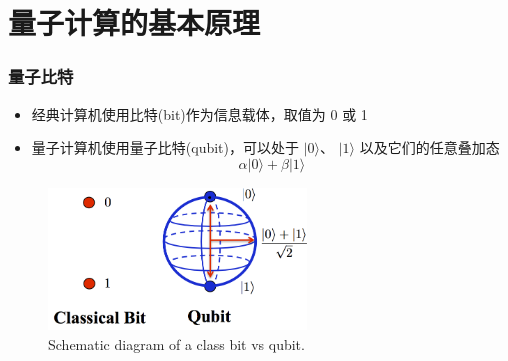 \section{量子计算的基本原理}
\begin{frame}
    \frametitle{量子比特}
    \begin{itemize}
	    \item 经典计算机使用比特\textrm{(bit)}作为信息载体，取值为 0 或 1
	    \item 量子计算机使用量子比特\textrm{(qubit)}，可以处于 \( |0\rangle \)、 \( |1\rangle \) 以及它们的任意叠加态 
		    \begin{displaymath}
			    \alpha|0\rangle+\beta|1\rangle
		    \end{displaymath}
		    {\fontsize{7.5pt}{5.2pt}\selectfont{其中 \( \alpha \) 和 \( \beta \) 是复数，且 \( |\alpha|^2 + |\beta|^2 = 1 \)}}
    \end{itemize}
            \begin{figure}
        \centering
                \includegraphics[height=1.5in, width=2.7in, viewport=0 0 360 195,clip]{Figures/Quantum-Bit.png}
		\caption{\tiny{\textrm{Schematic diagram of a class bit vs qubit.}}}
		\label{Fig:Quantum-Bit}
            \end{figure}
\end{frame}

